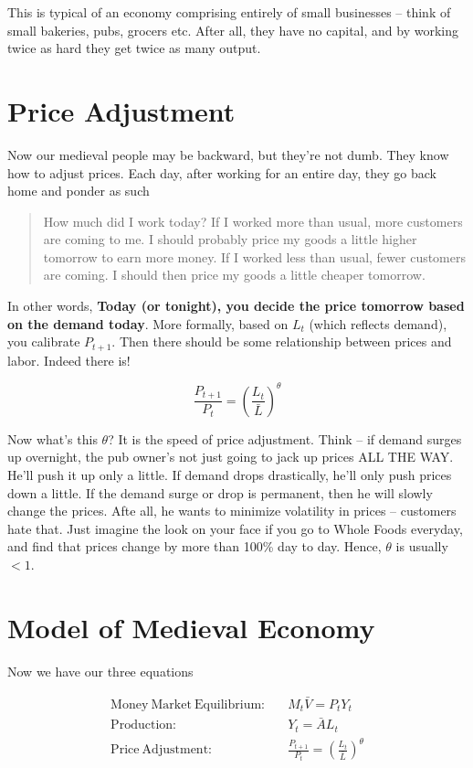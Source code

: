 \documentclass[11pt]{scrartcl}
\begin{document}
This is typical of an economy comprising entirely of small businesses -- think of small bakeries, pubs, grocers etc. After all, they have no capital, and by working twice as hard they get twice as many output.

\section{Price Adjustment}

Now our medieval people may be backward, but they're not dumb. They know how to adjust prices. Each day, after working for an entire day, they go back home and ponder as such

\begin{quote}
How much did I work today? If I worked more than usual, more customers are coming to me. I should probably price my goods a little higher tomorrow to earn more money. If I worked less than usual, fewer customers are coming. I should then price my goods a little cheaper tomorrow.
\end{quote}

In other words, \textbf{Today (or tonight), you decide the price tomorrow based on the demand today}. More formally, based on $L_t$ (which reflects demand), you calibrate $P_{t+1}$. Then there should be some relationship between prices and labor. Indeed there is!

\[\frac{P_{t+1}}{P_t} = \left(\frac{L_t}{\bar{L}}\right)^\theta \]

Now what's this $\theta$? It is the speed of price adjustment. Think -- if demand surges up overnight, the pub owner's not just going to jack up prices ALL THE WAY. He'll push it up only a little. If demand drops drastically, he'll only push prices down a little. If the demand surge or drop is permanent, then he will slowly change the prices. Afte all, he wants to minimize volatility in prices -- customers hate that. Just imagine the look on your face if you go to Whole Foods everyday, and find that prices change by more than 100\% day to day. Hence, $\theta$ is usually $<1$.

\section{Model of Medieval Economy}

Now we have our three equations

\begin{align}
\mathrm{Money\:Market\:Equilibrium:\;\;\;}&M_t \bar{V} = P_tY_t \\
\mathrm{Production:\;\;\;}&Y_t = \bar{A}L_t \\
\mathrm{Price\:Adjustment:\;\;\;}&\frac{P_{t+1}}{P_t} = \left(\frac{L_t}{\bar{L}}\right)^\theta 
\end{align}
\end{document}

